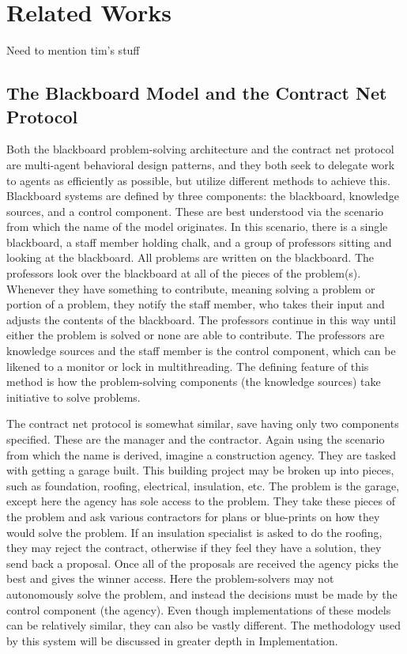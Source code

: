 \section{Related Works}
Need to mention tim’s stuff
\subsection{The Blackboard Model and the Contract Net Protocol}
Both the blackboard problem-solving architecture and the contract net protocol are multi-agent behavioral design patterns, and they both seek to delegate work to agents as efficiently as possible, but utilize different methods to achieve this. Blackboard systems are defined by three components: the blackboard, knowledge sources, and a control component. These are best understood via the scenario from which the name of the model originates. In this scenario, there is a single blackboard, a staff member holding chalk, and a group of professors sitting and looking at the blackboard. All problems are written on the blackboard. The professors look over the blackboard at all of the pieces of the problem(s). Whenever they have something to contribute, meaning solving a problem or portion of a problem, they notify the staff member, who takes their input and adjusts the contents of the blackboard. The professors continue in this way until either the problem is solved or none are able to contribute. The professors are knowledge sources and the staff member is the control component, which can be likened to a monitor or lock in multithreading. The defining feature of this method is how the problem-solving components (the knowledge sources) take initiative to solve problems.


The contract net protocol is somewhat similar, save having only two components specified. These are the manager and the contractor. Again using the scenario from which the name is derived, imagine a construction agency. They are tasked with getting a garage built. This building project may be broken up into pieces, such as foundation, roofing, electrical, insulation, etc. The problem is the garage, except here the agency has sole access to the problem. They take these pieces of the problem and ask various contractors for plans or blue-prints on how they would solve the problem. If an insulation specialist is asked to do the roofing, they may reject the contract, otherwise if they feel they have a solution, they send back a proposal. Once all of the proposals are received the agency picks the best and gives the winner access. Here the problem-solvers may not autonomously solve the problem, and instead the decisions must be made by the control component (the agency). Even though implementations of these models can be relatively similar, they can also be vastly different. The methodology used by this system will be discussed in greater depth in Implementation.
